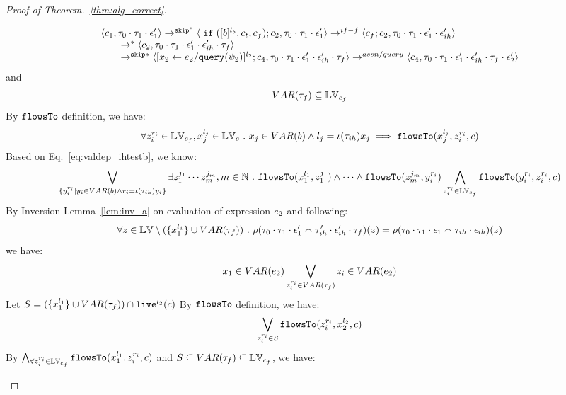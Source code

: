 \begin{proof}[Proof of Theorem.~\ref{thm:alg_correct}]
\begin{case}
\begin{subcase}
\begin{subsubcase}
\begin{subsubsubcase}
\begin{subproof}
\begin{enumerate}
\begin{enumerate}
\[
    \begin{array}{l}   
  \langle c_1, \mathtt{\tau}_0 \cdot \mathtt{\tau}_1 \cdot \mathtt{\epsilon}_1' \rangle 
  \rightarrow^{\mathtt{skip}^*} 
  \langle \;\mathtt{if}\; ([b]^{l_b}, c_t, c_f); {c}_2, \mathtt{\tau}_0 \cdot \mathtt{\tau}_1 \cdot \mathtt{\epsilon}_1' \rangle 
  \rightarrow^{if-f} 
  \langle c_f;c_2, \mathtt{\tau}_0 \cdot \mathtt{\tau}_1 \cdot \mathtt{\epsilon}_1' \cdot \mathtt{\epsilon}_{ih}' \rangle 
  \\
  \qquad \rightarrow^{*} 
  \langle c_2, 
  \mathtt{\tau}_0 \cdot \mathtt{\tau}_1 \cdot \mathtt{\epsilon}_1' \cdot \mathtt{\epsilon}_{ih}' \cdot \mathtt{\tau}_f \rangle
  \\
  \qquad \rightarrow^{\mathtt{skip}*} 
  \langle [\mathrel{ {x}_2 \leftarrow e_2 / {\tt query}(\psi_2) }]^{l_2};{c}_4, 
  \mathtt{\tau}_0 \cdot \mathtt{\tau}_1 \cdot \mathtt{\epsilon}_1' \cdot \mathtt{\epsilon}_{ih}' \cdot \mathtt{\tau}_f \rangle
  \rightarrow^{assn/query} 
  \langle {c}_4,  \mathtt{\tau}_0 \cdot \mathtt{\tau}_1 \cdot \mathtt{\epsilon}_1' \cdot \mathtt{\epsilon}_{ih}' \cdot \mathtt{\tau}_f \cdot \mathtt{\epsilon}_2' \rangle 
\end{array}
\]
and 
\[
  VAR{(\mathtt{\tau}_f)} \subseteq \mathbb{LV}_{c_f}
\]
%
By $\mathtt{flowsTo}$ definition, we have:
\[
  \forall z_i^{r_i} \in \mathbb{LV}_{c_f},  x_j^{l_j} \in \mathbb{LV}_c ~.~ x_j \in VAR(b) \land l_j = \iota(\mathtt{\tau}_{ih}) x_j \implies
  \mathtt{flowsTo}(x_j^{l_j}, z_i^{r_i}, c)
\]
%
Based on Eq.~\ref{eq:valdep_ihtestb}, we know:
%
\[
  \bigvee_{\{y_i^{r_i} \vert y_i \in VAR(b) \land r_i = \iota(\mathtt{\tau}_{ih}) y_i\}}
  \exists z_1^{j_1} \cdots z_m^{j_m}, m \in \mathbb{N} ~.~ 
  \mathtt{flowsTo}(x_1^{l_1}, z_1^{j_1}) \land \cdots \land  \mathtt{flowsTo}(z_m^{j_m}, y_i^{r_i})
  \bigwedge_{z_i^{r_i} \in \mathbb{LV}_{c_f}}
    \mathtt{flowsTo}(y_i^{r_i}, z_i^{r_i}, c) 
\]
%
By Inversion Lemma~\ref{lem:inv_a} on evaluation of expression $e_2$ and following: 
\[
  \forall z \in \mathbb{LV} \setminus (\{x_1^{l_1}\} \cup VAR{(\mathtt{\tau}_f)}) ~.~
  \rho(\mathtt{\tau}_0 \cdot \mathtt{\tau}_1 \cdot \mathtt{\epsilon}_1' \smallfrown \mathtt{\tau}_{ih}' \cdot \mathtt{\epsilon}_{ih}' \cdot \mathtt{\tau}_f)(z) 
  = \rho(\mathtt{\tau}_0 \cdot \mathtt{\tau}_1 \cdot \mathtt{\epsilon}_1 \smallfrown \mathtt{\tau}_{ih} \cdot \mathtt{\epsilon}_{ih})(z)
\]
%
we have:
\[
  x_1 \in VAR(e_2) \bigvee_{z_i^{r_i} \in VAR{(\mathtt{\tau}_f)}} z_i \in VAR(e_2)
\]
%
Let $S = (\{x_1^{l_1}\} \cup VAR{(\mathtt{\tau}_f)}) \cap \mathtt{live}^{l_2}(c) $
%
By $\mathtt{flowsTo}$ definition, we have:
\[
   \bigvee_{z_i^{r_i} \in S}  \mathtt{flowsTo}(z_i^{r_i}, x_2^{l_2}, c)
\]
By $ \bigwedge_{\forall z_i^{r_i} \in \mathbb{LV}_{c_f}} \mathtt{flowsTo}(x_1^{l_1}, z_i^{r_i}, c)$ and $S \subseteq VAR{(\mathtt{\tau}_f)} \subseteq \mathbb{LV}_{c_f}$, we have:

\end{enumerate}
\end{enumerate}
\end{subproof}
\end{subsubsubcase}
\end{subsubcase}
\end{subcase}
\end{case}
\end{proof}
